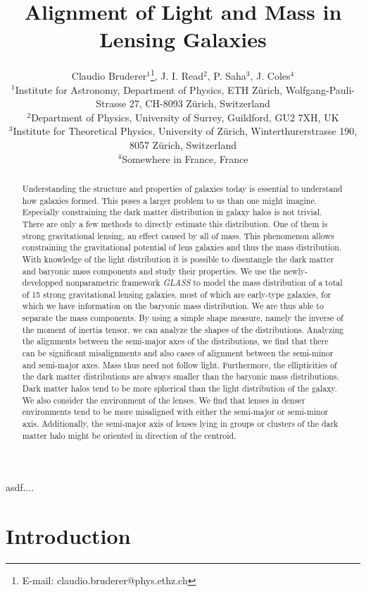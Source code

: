 \documentclass[useAMS,usenatbib]{mn2e}
\title[Alignment of Light and Mass in Lensing Galaxies]{Alignment of Light and Mass in Lensing Galaxies}
\author[Bruderer]{Claudio Bruderer$^{1}$\thanks{E-mail: claudio.bruderer@phys.ethz.ch}, J. I. Read$^{2}$, P. Saha$^{3}$, J. Coles$^{4}$\\
$^{1}$Institute for Astronomy, Department of Physics, ETH Z\"urich, Wolfgang-Pauli-Strasse 27, CH-8093 Z\"urich, Switzerland\\
$^{2}$Department of Physics, University of Surrey, Guildford, GU2 7XH, UK\\
$^{3}$Institute for Theoretical Physics, University of Z\"urich, Winterthurerstrasse 190, 8057 Z\"urich, Switzerland\\
$^{4}$Somewhere in France, France
}
\begin{document}
\maketitle

\begin{abstract}
Understanding the structure and properties of galaxies today is essential to understand how galaxies formed. This poses a larger problem to us than one might imagine. Especially constraining the dark matter distribution in galaxy halos is not trivial. There are only a few methods to directly estimate this distribution. One of them is strong gravitational lensing, an effect caused by all of mass. This phenomenon allows constraining the gravitational potential of lens galaxies and thus the mass distribution. With knowledge of the light distribution it is possible to disentangle the dark matter and baryonic mass components and study their properties.
We use the newly-developped nonparametric framework \textit{GLASS} to model the mass distribution of a total of 15 strong gravitational lensing galaxies, most of which are early-type galaxies, for which we have information on the baryonic mass distribution. We are thus able to separate the mass components. By using a simple shape measure, namely the inverse of the moment of inertia tensor, we can analyze the shapes of the distributions. Analyzing the alignments between the semi-major axes of the distributions, we find that there can be significant misalignments and also cases of alignment between the semi-minor and semi-major axes. Mass thus need not follow light. Furthermore, the ellipticities of the dark matter distributions are always smaller than the baryonic mass distributions. Dark matter halos tend to be more spherical than the light distribution of the galaxy. We also consider the environment of the lenses. We find that lenses in denser environments tend to be more misaligned with either the semi-major or semi-minor axis. Additionally, the semi-major axis of lenses lying in groups or clusters of the dark matter halo might be oriented in direction of the centroid.
\end{abstract}

\begin{keywords}
asdf....
\end{keywords}


\section{Introduction}\label{sec:introduction}
\end{document}
